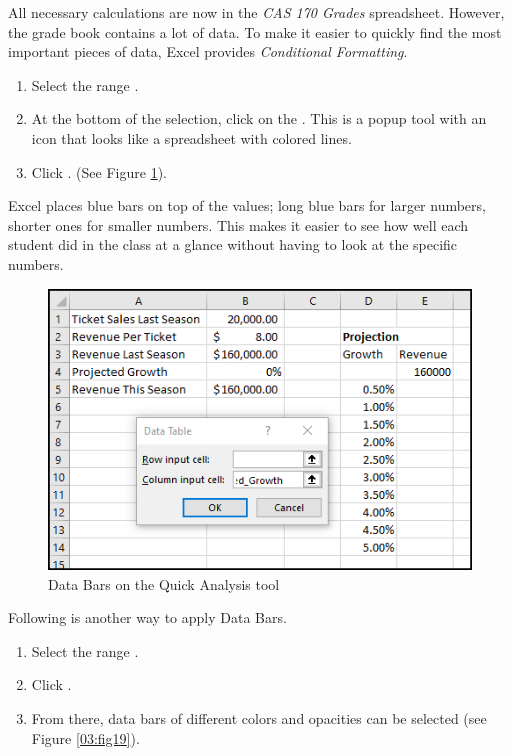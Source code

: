 All necessary calculations are now in the \textit{CAS 170 Grades} spreadsheet. However, the grade book contains a lot of data. To make it easier to quickly find the most important pieces of data, Excel provides \textit{Conditional Formatting}.

\begin{enumerate}
	\item Select the range .
	\item At the bottom of the selection, click on the . This is a popup tool with an icon that looks like a spreadsheet with colored lines.
	\item Click . (See Figure \ref{03:fig18}).
\end{enumerate}

Excel places blue bars on top of the values; long blue bars for larger numbers, shorter ones for smaller numbers. This makes it easier to see how well each student did in the class at a glance without having to look at the specific numbers.

\begin{figure}[H]
	\centering
	\includegraphics[width=\maxwidth{.95\linewidth}]{gfx/ch03_fig18}
	\caption{Data Bars on the Quick Analysis tool}
	\label{03:fig18}
\end{figure}

Following is another way to apply Data Bars.

\begin{enumerate}
	\item Select the range .
	\item Click . 	
	\item From there, data bars of different colors and opacities can be selected (see Figure \ref{03:fig19}).
\end{enumerate}

